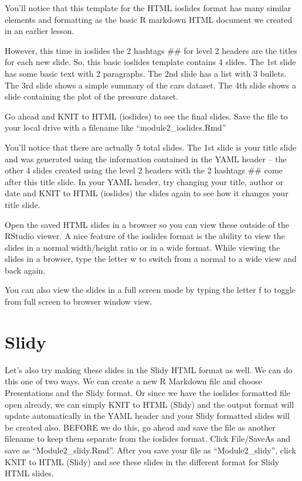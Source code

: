 \documentclass[]{book}
\theoremstyle{definition}
\theoremstyle{definition}
\theoremstyle{definition}
\theoremstyle{remark}
\begin{document}
You'll notice that this template for the HTML ioslides format has many
similar elements and formatting as the basic R markdown HTML document we
created in an earlier lesson.

However, this time in ioslides the 2 hashtags \#\# for level 2 headers
are the titles for each new slide. So, this basic ioslides template
contains 4 slides. The 1st slide has some basic text with 2 paragraphs.
The 2nd slide has a list with 3 bullets. The 3rd slide shows a simple
summary of the cars dataset. The 4th slide shows a slide containing the
plot of the pressure dataset.

Go ahead and KNIT to HTML (ioslides) to see the final slides. Save the
file to your local drive with a filename like ``module2\_ioslides.Rmd''

You'll notice that there are actually 5 total slides. The 1st slide is
your title slide and was generated using the information contained in
the YAML header -- the other 4 slides created using the level 2 headers
with the 2 hashtags \#\# come after this title slide. In your YAML
header, try changing your title, author or date and KNIT to HTML
(ioslides) the slides again to see how it changes your title slide.

Open the saved HTML slides in a browser so you can view these outside of
the RStudio viewer. A nice feature of the ioslides format is the ability
to view the slides in a normal width/height ratio or in a wide format.
While viewing the slides in a browser, type the letter w to switch from
a normal to a wide view and back again.

You can also view the slides in a full screen mode by typing the letter
f to toggle from full screen to browser window view.

\section{Slidy}\label{slidy}

Let's also try making these slides in the Slidy HTML format as well. We
can do this one of two ways. We can create a new R Markdown file and
choose Presentations and the Slidy format. Or since we have the ioslides
formatted file open already, we can simply KNIT to HTML (Slidy) and the
output format will update automatically in the YAML header and your
Slidy formatted slides will be created also. BEFORE we do this, go ahead
and save the file as another filename to keep them separate from the
ioslides format. Click File/SaveAs and save as ``Module2\_slidy.Rmd''.
After you save your file as ``Module2\_slidy'', click KNIT to HTML
(Slidy) and see these slides in the different format for Slidy HTML
slides.
\end{document}
